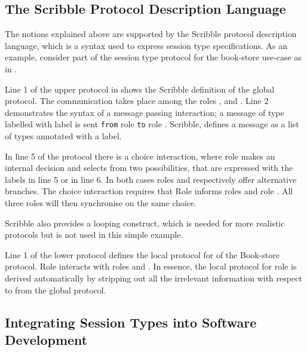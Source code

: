 \subsection{The Scribble Protocol Description Language}
\label{sec:scribble}
The notions explained above are supported by the
Scribble protocol description language,
which is a syntax used to express session type specifications.
As an example,
consider part of the session type protocol for the book-store
use-case as in .




Line 1 of the upper protocol in  shows the
Scribble definition of the global protocol.
The communication takes place
among the roles \BuyerOne, \BuyerTwo and \Seller. Line 2 demonstrates
the syntax of a message passing interaction; a message
of type  labelled with label  is sent \lstinline|from|
role \BuyerOne \lstinline|to| role \Seller. Scribble, defines a message 
as a list of types annotated with a label.

In line 5 of the protocol
there is a choice interaction,
where role \BuyerTwo makes an internal decision and selects
from two possibilities, that are
expressed with the labels  in line 5 or  in line 6.
In  both cases roles \BuyerOne and \Seller respectively offer
alternative branches. The choice interaction requires that
Role \BuyerTwo informs roles \BuyerOne and role \Seller. All
three roles will then synchronise on the same choice.

Scribble also provides a looping construct, which is needed for more realistic protocols but is not used in this simple example.


Line 1 of the lower protocol defines the local protocol
for \BuyerOne of the Book-store protocol. Role \BuyerOne
interacts with roles \BuyerTwo and \Seller. In essence,
the local protocol for role \BuyerOne is derived automatically
by stripping out all the irrelevant information with respect
to \BuyerOne from the global protocol.



\subsection{Integrating Session Types into Software Development}%
\label{sec:sessions_integrate}

